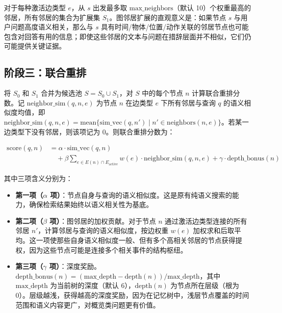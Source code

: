 对于每种激活边类型 $e$，从 $s$ 出发最多取 $\mathrm{max\_neighbors}$（默认 10）个权重最高的邻居，所有邻居的集合为扩展集 $S_1$。图邻居扩展的直观意义是：如果节点 $s$ 与用户问题高度语义相关，那么与 $s$ 具有时间/物体/位置/动作关联的邻居节点也可能包含对回答有用的信息；即使这些邻居的文本与问题在措辞层面并不相似，它们仍可能提供关键证据。

\subsection{阶段三：联合重排}

将 $S_0$ 和 $S_1$ 合并为候选池 $S = S_0 \cup S_1$，对 $S$ 中的每个节点 $n$ 计算联合重排分数。记 $\mathrm{neighbor\_sim}(q, n, e)$ 为节点 $n$ 在边类型 $e$ 下所有邻居与查询 $q$ 的语义相似度均值，即 $\mathrm{neighbor\_sim}(q, n, e) = \text{mean}\{ \mathrm{sim\_vec}(q, n') \mid n' \in \mathrm{neighbors}(n, e) \}$。若某一边类型下没有邻居，则该项记为 0。则联合重排分数为：

\begin{equation}
\begin{aligned}
\mathrm{score}(q, n) &= \alpha \cdot \mathrm{sim\_vec}(q, n) \\
  &\quad + \beta \sum_{e \in E(n) \cap E_{\mathrm{active}}} w(e) \cdot \mathrm{neighbor\_sim}(q, n, e)
   + \gamma \cdot \mathrm{depth\_bonus}(n)
\end{aligned}
\label{eq:3-2}
\end{equation}

其中三项含义分别为：

\begin{itemize}
\item \textbf{第一项（$\alpha$ 项）}：节点自身与查询的语义相似度。这是原有纯语义搜索的能力，确保检索结果始终以语义相关性为基底。
\item \textbf{第二项（$\beta$ 项）}：图邻居的加权贡献。对于节点 $n$ 通过激活边类型连接的所有邻居 $n'$，计算邻居与查询的语义相似度，按边权重 $w(e)$ 加权求和后取平均。这一项使那些自身语义相似度一般、但有多个高相关邻居的节点获得提权，因为这些节点可能是连接多个相关事件的结构枢纽。
\item \textbf{第三项（$\gamma$ 项）}：深度奖励。$\mathrm{depth\_bonus}(n) = (\mathrm{max\_depth} - \mathrm{depth}(n)) / \mathrm{max\_depth}$，其中 $\mathrm{max\_depth}$ 为当前树的深度（默认 6），$\mathrm{depth}(n)$ 为节点所在层级（根为 0）。层级越浅，获得越高的深度奖励，因为在记忆树中，浅层节点覆盖的时间范围和语义内容更广，对概览类问题更有价值。
\end{itemize}

